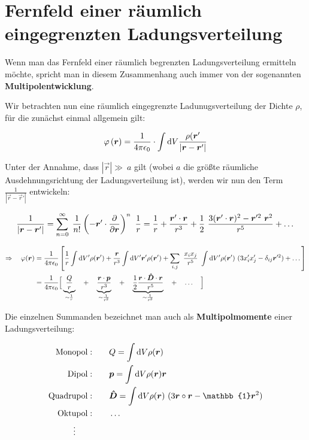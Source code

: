 \section{Fernfeld einer räumlich eingegrenzten Ladungsverteilung}

Wenn man das Fernfeld einer räumlich begrenzten Ladungsverteilung ermitteln möchte, spricht man in diesem Zusammenhang auch immer von der sogenannten \textbf{Multipolentwicklung}.

Wir betrachten nun eine räumlich eingegrenzte Ladunugsverteilung der Dichte $\rho$, für die zunächst einmal allgemein gilt:

\begin{equation*}
\varphi\left(\bm{r}\right) = \frac{1}{4\pi\epsilon_0}\cdot\int\mathrm{d} V \frac{\rho(\bm{r}'}{|\bm{r}-\bm{r}'|}
\end{equation*}

Unter der Annahme, dass $|\vec{r}| \gg \ a$ gilt (wobei $a$ die größte räumliche Ausdehnungsrichtung der Ladungsverteilung ist), werden wir nun den Term $\frac{1}{|\vec{r}-\vec{r}'|}$ entwickeln:

\begin{equation*}
\frac{1}{|\bm{r}-\bm{r}'|} = \sum_{n=0}^{\infty} \; \frac{1}{n!}\left(-\bm{r}'\cdot\frac{\partial{}}{\partial{\bm{r}}}\right)^n \ \frac{1}{r} = \frac{1}{r} + \frac{\bm{r}'\cdot\bm{r}}{r^3} + \frac{1}{2} \ \frac{3 (\bm{r}'\cdot\bm{r})^2 - \bm{r}'^2 \ \bm{r}^2}{r^5} + \dotsc
\end{equation*}

\begin{align*}
\Rightarrow \quad \varphi(\bm{r}) &= \frac{1}{4\pi\epsilon_0} \left[ \frac{1}{r}\int\mathrm{d} V' \rho(\bm{r}') + \frac{\bm{r}}{r^3} \int\mathrm{d} V' \bm{r}' \rho(\bm{r}') + \sum_{i,j} \ \frac{x_i x_j}{r^5} \ \int\mathrm{d} V' \rho(\bm{r}') \ (3x_i'x_j' - \delta_{ij}\bm{r}'^2) + \dotsc\right] \\
&= \frac{1}{4\pi\epsilon_0} \Big[\underbrace{\frac{Q}{r}}_{\sim\frac{1}{r}} \quad + \quad \underbrace{\frac{\bm{r}\cdot\bm{p}}{r^3}}_{\sim\frac{1}{r^2}} \quad + \quad \underbrace{\frac{1}{2}\frac{\bm{r}\cdot \bm{\hat{D}} \cdot\bm{r}}{r^5}}_{\sim\frac{1}{r^3}} \quad + \quad \dotsc \quad \Big]
\end{align*}

Die einzelnen Summanden bezeichnet man auch als \textbf{Multipolmomente} einer Ladungsverteilung:

\begin{align*}
\mathrm{Monopol:}& \qquad Q = \int\d V \rho(\vec{r})\\
\mathrm{Dipol:}& \qquad \vec{p} = \int\d V \rho(\vec{r})\vec{r}\\
\mathrm{Quadrupol:}& \qquad \tens{D} = \int\d V \rho(\vec{r}) \ (3\vec{r}\circ\vec{r}-\mathbb{1}\vec{r}^2)\\
\mathrm{Oktupol:}& \qquad \dotsc\\
\vdots \qquad &
\end{align*}

